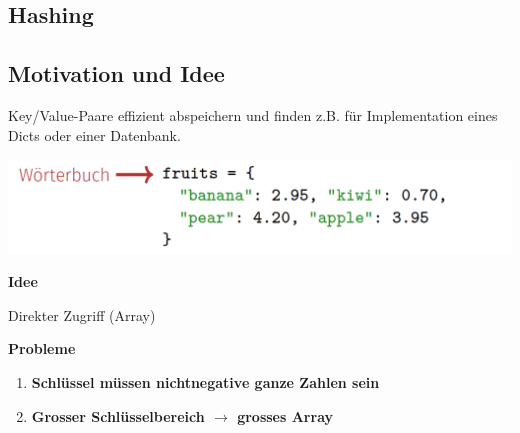 \vspace{-4pt}
\begin{sectionbox}
\section{Hashing}
\subsection{Motivation und Idee}\smallskip
Key/Value-Paare effizient abspeichern und finden z.B. für Implementation eines Dicts oder einer Datenbank.\par\smallskip

\begin{center}
    \includegraphics[width = 0.8\columnwidth]{../img/BspPreHashing.png}
\end{center}\smallskip

\textbf{Idee}\par
Direkter Zugriff (Array)\par\smallskip
\begin{greenbox}
\textbf{Probleme}\par
\begin{enumerate}
    \item \textbf{Schlüssel müssen nichtnegative ganze Zahlen sein}
    \item \textbf{Grosser Schlüsselbereich $\rightarrow$ grosses Array}
\end{enumerate}
\end{greenbox}
\end{sectionbox}
\vspace{-4pt}
